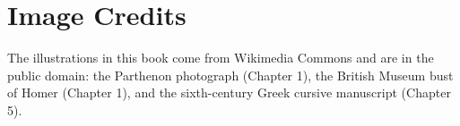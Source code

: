 \documentclass[10pt,twoside,openany]{book}
\begin{document}
\PSEBeginFrontMatter
\PSETitlePage
\PSEPublicationPage
\tableofcontents
\clearpage
\PSEBeginBody





\PSEBeginBackMatter
\chapter*{Image Credits}
The illustrations in this book come from Wikimedia Commons and are in the
public domain: the Parthenon photograph (Chapter 1), the British Museum
bust of Homer (Chapter 1), and the sixth-century Greek cursive manuscript
(Chapter 5).
\PSEPrintIndex
\end{document}
